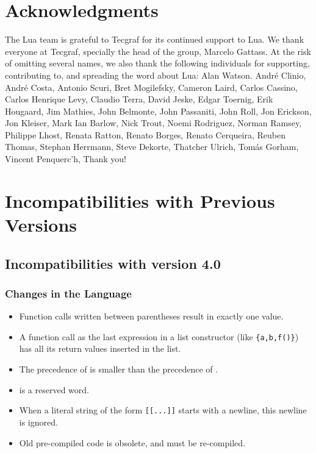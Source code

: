 \documentclass[11pt,twoside,draft]{article}
\makeatletter
\def\tecgraf{{\sf Tecgraf}}
\newcommand{\Index}[1]{#1\index{#1@{\lowercase{#1}}}}
\makeatother
\begin{document}
\section*{Acknowledgments}

The Lua team is grateful to \tecgraf{} for its continued support to Lua.
We thank everyone at \tecgraf{},
specially the head of the group, Marcelo Gattass.
At the risk of omitting several names,
we also thank the following individuals for supporting,
contributing to, and spreading the word about Lua:
Alan Watson.
Andr\'e Clinio,
Andr\'e Costa,
Antonio Scuri,
Bret Mogilefsky,
Cameron Laird,
Carlos Cassino,
Carlos Henrique Levy,
Claudio Terra,
David Jeske,
Edgar Toernig,
Erik Hougaard,
Jim Mathies,
John Belmonte,
John Passaniti,
John Roll,
Jon Erickson,
Jon Kleiser,
Mark Ian Barlow,
Nick Trout,
Noemi Rodriguez,
Norman Ramsey,
Philippe Lhost,
Renata Ratton,
Renato Borges,
Renato Cerqueira,
Reuben Thomas,
Stephan Herrmann,
Steve Dekorte,
Thatcher Ulrich,
Tom\'as Gorham,
Vincent Penquerc'h,
Thank you!


\appendix

\section*{Incompatibilities with Previous Versions}

\subsection*{Incompatibilities with \Index{version 4.0}}

\subsubsection*{Changes in the Language}
\begin{itemize}

\item
Function calls written between parentheses result in exactly one value.

\item
A function call as the last expression in a list constructor
(like \verb|{a,b,f()}|) has all its return values inserted in the list.

\item
The precedence of  is smaller than the precedence of .

\item
{} is a reserved word.

\item
When a literal string of the form \verb|[[...]]| starts with a newline,
this newline is ignored.

\item Old pre-compiled code is obsolete, and must be re-compiled.

\end{itemize}
\end{document}
